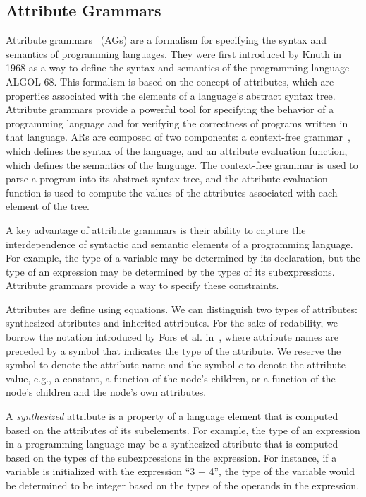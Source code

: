 \subsection{Attribute Grammars}
\label{chap:attr-grammars}
Attribute grammars~\cite{knuth1968semantics} (AGs) are a formalism for specifying
the syntax and semantics of programming languages.
They were first introduced by Knuth in 1968 as a way to define the syntax and semantics of the programming
language ALGOL 68. This formalism is based on the concept of attributes, 
which are properties associated with the elements of a language's abstract syntax tree.
Attribute grammars provide a powerful tool for specifying the behavior of a programming 
language and for verifying the correctness of programs written in that language.
%
ARs are composed of two components: a context-free grammar~\cite{CREMERS197586}, 
which defines the syntax of the language, and an attribute evaluation function, 
which defines the semantics of the language. The context-free grammar is used to 
parse a program into its abstract syntax tree, and the attribute evaluation function 
is used to compute the values of the attributes associated with each element 
of the tree.

A key advantage of attribute grammars is their ability to capture the 
interdependence of syntactic and semantic elements of a programming language. 
For example, the type of a variable may be determined by its declaration, 
but the type of an expression may be determined by the types of its subexpressions. 
Attribute grammars provide a way to specify these constraints.

Attributes are define using equations. We can distinguish two types of
attributes: synthesized attributes and inherited attributes.
For the sake of redability, we borrow the notation introduced by Fors et al. in~\cite{fors2020patterns}, 
where attribute names are preceded by a symbol that indicates the type of the attribute.
We reserve the symbol  to denote the attribute name and the symbol $e$ to denote the attribute value,
e.g., a constant, a function of the node's children, or a function of the node's children 
and the node's own attributes. 

A \emph{synthesized} attribute is a property of a language element that is computed 
based on the attributes of its subelements. For example, the type of an expression 
in a programming language may be a synthesized attribute that is computed based 
on the types of the subexpressions in the expression. For instance, if a variable is initialized
with the expression ``3 + 4'', the type of the variable would be determined to 
be integer based on the types of the operands in the expression.

